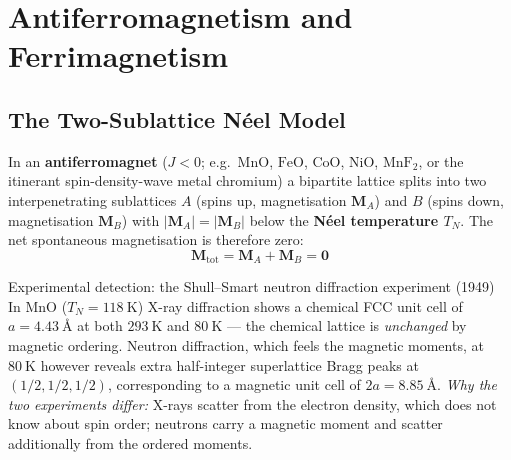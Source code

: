\documentclass[11pt,a4paper]{article}
\newcommand{\vb}[1]{\mathbf{#1}}
\newcommand{\Ang}{\text{\AA}}
\begin{document}
\clearpage
\section{Antiferromagnetism and Ferrimagnetism}
\label{ch:afm}

\subsection{The Two-Sublattice N\'eel Model}

In an \textbf{antiferromagnet} ($J<0$; e.g.\ $\text{MnO}$, $\text{FeO}$, $\text{CoO}$, $\text{NiO}$, $\text{MnF}_2$, or the itinerant spin-density-wave metal chromium) a bipartite lattice splits into two interpenetrating sublattices $A$ (spins up, magnetisation $\vb{M}_A$) and $B$ (spins down, magnetisation $\vb{M}_B$) with $|\vb{M}_A| = |\vb{M}_B|$ below the \textbf{N\'eel temperature $T_N$}. The net spontaneous magnetisation is therefore zero:
\begin{equation}
    \vb{M}_{\mathrm{tot}} = \vb{M}_A + \vb{M}_B = \vb{0}
    \label{eq:afmnet}
\end{equation}

\begin{sketchbox}{Experimental detection: the Shull--Smart neutron diffraction experiment (1949)}
In $\text{MnO}$ ($T_N = 118\ \mathrm{K}$) X-ray diffraction shows a chemical FCC unit cell of $a = 4.43\ \Ang$ at both $293\ \mathrm{K}$ and $80\ \mathrm{K}$ --- the chemical lattice is \emph{unchanged} by magnetic ordering. Neutron diffraction, which feels the magnetic moments, at $80\ \mathrm{K}$ however reveals extra half-integer superlattice Bragg peaks at $(1/2,1/2,1/2)$, corresponding to a magnetic unit cell of $2a = 8.85\ \Ang$. \emph{Why the two experiments differ:} X-rays scatter from the electron density, which does not know about spin order; neutrons carry a magnetic moment and scatter additionally from the ordered moments.
\end{sketchbox}
\end{document}
